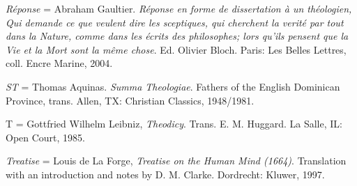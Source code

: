 \documentclass[]{article}
\begin{document}
\emph{Réponse} = Abraham Gaultier. \emph{Réponse en forme de
	dissertation à un théologien, Qui demande ce que veulent dire les
	sceptiques, qui cherchent la verité par tout dans la Nature, comme dans
	les écrits des philosophes; lors qu'ils pensent que la Vie et la Mort
	sont la même chose}. Ed. Olivier Bloch. Paris: Les Belles Lettres, coll.
Encre Marine, 2004.

\emph{ST} = Thomas Aquinas. \emph{Summa Theologiae}. Fathers of the
English Dominican Province, trans. Allen, TX: Christian Classics,
1948/1981.

T = Gottfried Wilhelm Leibniz, \emph{Theodicy}. Trans. E. M. Huggard. La
Salle, IL: Open Court, 1985.

\emph{Treatise} = Louis de La Forge, \emph{Treatise on the Human Mind
	(1664)}. Translation with an introduction and notes by D. M. Clarke.
Dordrecht: Kluwer, 1997.


\printbibliography
\end{document}

